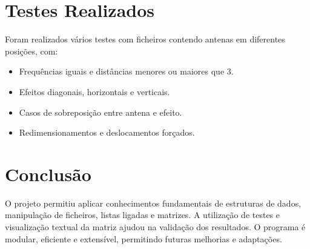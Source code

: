 \documentclass[a4paper,12pt]{report}
\begin{document}
    \chapter{Testes Realizados}
    Foram realizados vários testes com ficheiros contendo antenas em diferentes posições, com:
    \begin{itemize}
        \item Frequências iguais e distâncias menores ou maiores que 3.
        \item Efeitos diagonais, horizontais e verticais.
        \item Casos de sobreposição entre antena e efeito.
        \item Redimensionamentos e deslocamentos forçados.
    \end{itemize}
    
    \chapter{Conclusão}
    O projeto permitiu aplicar conhecimentos fundamentais de estruturas de dados, manipulação de ficheiros, listas ligadas e matrizes. A utilização de testes e visualização textual da matriz ajudou na validação dos resultados. O programa é modular, eficiente e extensível, permitindo futuras melhorias e adaptações.
    
    
    
\end{document}

